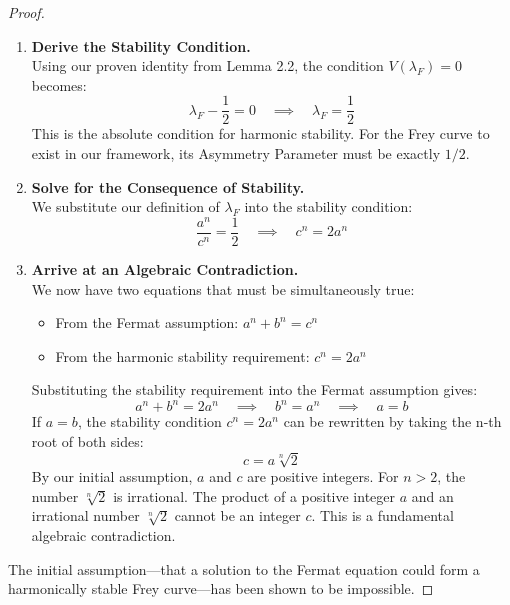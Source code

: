 \documentclass{amsart}
\theoremstyle{plain}
\theoremstyle{definition}
\theoremstyle{remark}
\begin{document}
\begin{proof}
\begin{enumerate}
    \item \textbf{Derive the Stability Condition.} \\
    Using our proven identity from Lemma 2.2, the condition $V(\lambda_F) = 0$ becomes:
    \begin{equation}
        \lambda_F - \frac{1}{2} = 0 \quad \implies \quad \lambda_F = \frac{1}{2}
    \end{equation}
    This is the absolute condition for harmonic stability. For the Frey curve to exist in our framework, its Asymmetry Parameter must be exactly $1/2$.

    \item \textbf{Solve for the Consequence of Stability.} \\
    We substitute our definition of $\lambda_F$ into the stability condition:
    \begin{equation}
        \frac{a^n}{c^n} = \frac{1}{2} \quad \implies \quad c^n = 2a^n
    \end{equation}

    \item \textbf{Arrive at an Algebraic Contradiction.} \\
    We now have two equations that must be simultaneously true:
    \begin{itemize}
        \item From the Fermat assumption: $a^n + b^n = c^n$
        \item From the harmonic stability requirement: $c^n = 2a^n$
    \end{itemize}
    Substituting the stability requirement into the Fermat assumption gives:
    \begin{equation}
        a^n + b^n = 2a^n \quad \implies \quad b^n = a^n \quad \implies \quad a = b
    \end{equation}
    If $a=b$, the stability condition $c^n = 2a^n$ can be rewritten by taking the n-th root of both sides:
    \begin{equation}
        c = a\sqrt[n]{2}
    \end{equation}
    By our initial assumption, $a$ and $c$ are positive integers. For $n>2$, the number $\sqrt[n]{2}$ is irrational. The product of a positive integer $a$ and an irrational number $\sqrt[n]{2}$ cannot be an integer $c$. This is a fundamental algebraic contradiction.
\end{enumerate}
The initial assumption—that a solution to the Fermat equation could form a harmonically stable Frey curve—has been shown to be impossible.
\end{proof}
\end{document}

